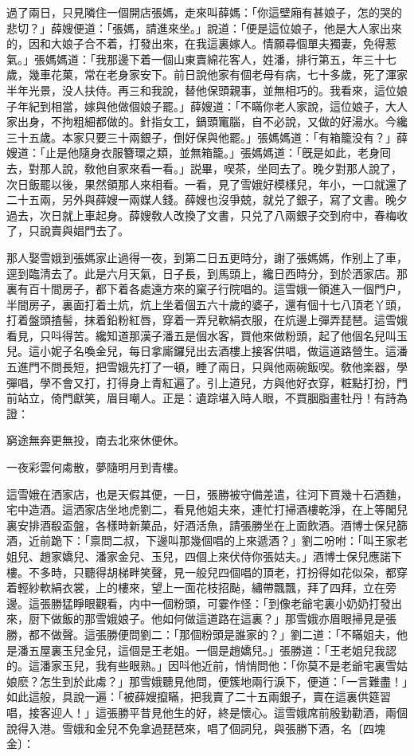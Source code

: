 過了兩日，只見隣住一個開店張媽，走來叫薛媽：「你這壁廂有甚娘子，怎的哭的悲切？」薛嫂便道：「張媽，請進來坐。」說道：「便是這位娘子，他是大人家出來的，因和大娘子合不着，打發出來，在我這裏嫁人。情願尋個單夫獨妻，免得惹氣。」張媽媽道：「我那邊下着一個山東賣綿花客人，姓潘，排行第五，年三十七歲，幾車花菓，常在老身家安下。前日說他家有個老母有病，七十多歲，死了渾家半年光景，没人扶侍。再三和我說，替他保頭親事，並無相巧的。我看來，這位娘子年紀到相當，嫁與他做個娘子罷。」薛嫂道：「不瞞你老人家說，這位娘子，大人家出身，不拘粗細都做的。針指女工，鍋頭竃腦，自不必說，又做的好湯水。今纔三十五歲。本家只要三十兩銀子，倒好保與他罷。」張媽媽道：「有箱籠没有？」薛嫂道：「止是他隨身衣服簪環之類，並無箱籠。」張媽媽道：「旣是如此，老身囘去，對那人說，敎他自家來看一看。」説畢，喫茶，坐囘去了。晚夕對那人說了，次日飯罷以後，果然領那人來相看。一看，見了雪娥好模樣兒，年小，一口就還了二十五兩，另外與薛嫂一兩媒人錢。薛嫂也沒爭兢，就兑了銀子，寫了文書。晚夕過去，次日就上車起身。薛嫂敎人改換了文書，只兑了八兩銀子交到府中，春梅收了，只說賣與娼門去了。

那人娶雪娥到張媽家止過得一夜，到第二日五更時分，謝了張媽媽，作别上了車，逕到臨清去了。此是六月天氣，日子長，到馬頭上，纔日西時分，到於洒家店。那裏有百十間房子，都下着各處遠方來的窠子行院唱的。這雪娥一領進入一個門户，半間房子，裏面打着土炕，炕上坐着個五六十歲的婆子，還有個十七八頂老丫頭，打着盤頭揸髻，抹着鉛粉紅唇，穿着一弄兒軟絹衣服，在炕邊上彈弄琵琶。這雪娥看見，只呌得苦。纔知道那漢子潘五是個水客，買他來做粉頭，起了他個名兒叫玉兒。這小妮子名喚金兒，每日拿廝鑼兒出去酒樓上接客供唱，做這道路營生。這潘五進門不問長短，把雪娥先打了一頓，睡了兩日，只與他兩碗飯喫。敎他楽器，學彈唱，學不會又打，打得身上青紅遍了。引上道兒，方與他好衣穿，粧點打扮，門前站立，倚門獻笑，眉目嘲人。正是：遺踪堪入時人眼，不買胭脂畫牡丹！有詩為證：

\begin{myquote}
窮途無奔更無投，南去北來休便休。

一夜彩雲何䖏散，夢隨明月到青樓。
\end{myquote}

這雪娥在洒家店，也是天假其便，一日，張勝被守備差遣，往河下買幾十石酒麯，宅中造酒。這洒家店坐地虎劉二，看見他姐夫來，連忙打掃酒樓乾淨，在上等閣兒裏安排酒殽盃盤，各樣時新菓品，好酒活魚，請張勝坐在上面飲酒。酒博士保兒篩酒，近前跪下：「禀問二叔，下邊叫那幾個唱的上來遞酒？」劉二吩咐：「叫王家老姐兒、趙家嬌兒、潘家金兒、玉兒，四個上來伏侍你張姑夫。」酒博士保兒應諾下樓。不多時，只聽得胡梯畔笑聲，見一般兒四個唱的頂老，打扮得如花似朶，都穿着輕紗軟絹衣裳，上的樓來，望上一面花枝招颭，繡帶飄飄，拜了四拜，立在旁邊。這張勝猛睜眼觀看，内中一個粉頭，可霎作怪：「到像老爺宅裏小奶奶打發出來，厨下做飯的那雪娥娘子。他如何做這道路在這裏？」那雪娥亦眉眼掃見是張勝，都不做聲。這張勝便問劉二：「那個粉頭是誰家的？」劉二道：「不瞞姐夫，他是潘五屋裏玉兒金兒，這個是王老姐。一個是趙嬌兒。」張勝道：「王老姐兒我認的。這潘家玉兒，我有些眼熟。」因呌他近前，悄悄問他：「你莫不是老爺宅裏雪姑娘麽？怎生到於此䖏？」那雪娥聽見他問，便簇地兩行淚下，便道：「一言難盡！」如此這般，具說一遍：「被薛嫂攛瞞，把我賣了二十五兩銀子，賣在這裏供筵習唱，接客迎人！」這張勝平昔見他生的好，終是懷心。這雪娥席前殷勤勸酒，兩個說得入港。雪娥和金兒不免拿過琵琶來，唱了個詞兒，與張勝下酒，名〔四塊金〕：


